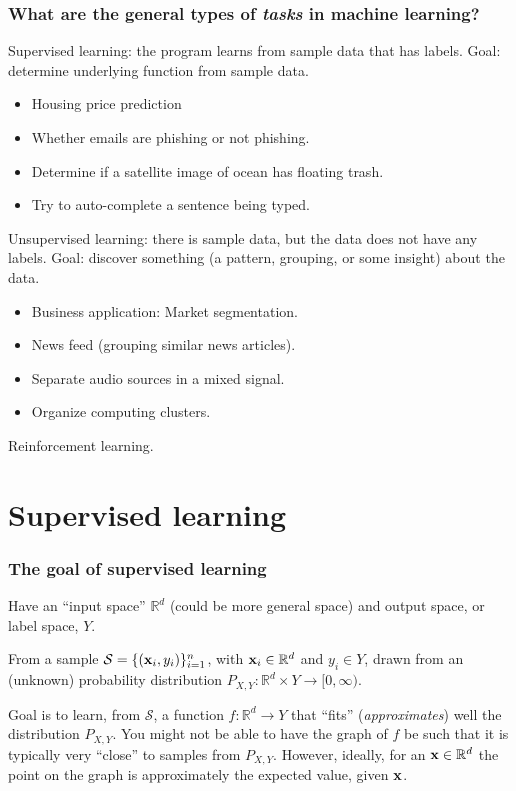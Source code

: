 \documentclass{beamer}
\theoremstyle{example}
\begin{document}
\begin{frame}
\frametitle{What are the general types of \emph{tasks} in machine learning?}
Supervised learning: the program learns from sample data that has labels. Goal: determine underlying function from sample data.
    \begin{itemize}
        \item Housing price prediction
        \item Whether emails are phishing or not phishing.
        \item Determine if a satellite image of ocean has floating trash.
        \item Try to auto-complete a sentence being typed.
    \end{itemize}
Unsupervised learning: there is sample data, but the data does not have any labels. Goal: discover something (a pattern, grouping, or some insight) about the data.
    \begin{itemize}
        \item Business application: Market segmentation.
        \item News feed (grouping similar news articles).
        \item Separate audio sources in a mixed signal.
        \item Organize computing clusters.
    \end{itemize}
Reinforcement learning.
\end{frame}

\section{Supervised learning}

\begin{frame}
\frametitle{The goal of supervised learning}
Have an ``input space'' $\mathbb R^{d}$ (could be more general space) and output space, or label space, $Y$. 

From a sample $\mathcal S = \{({\bf x}_i, y_i)\}_{i=1}^n$, with ${\bf x}_i\in\mathbb R^d$ and $y_i\in Y$, drawn from an (unknown) probability distribution $P_{X,Y}:\mathbb R^{d}\times Y \to [0, \infty)$. 

Goal is to learn, from $\mathcal S$, a function $f:\mathbb R^d\to Y$ that ``fits'' (\textit{approximates}) well the distribution $P_{X,Y}$. You might not be able to have the graph of $f$ be such that it is typically very ``close'' to samples from $P_{X,Y}$. However, ideally, for an ${\bf x}\in\mathbb R^d$ the point on the graph is approximately the expected value, given ${\bf x}$.

\end{frame}
\end{document}
